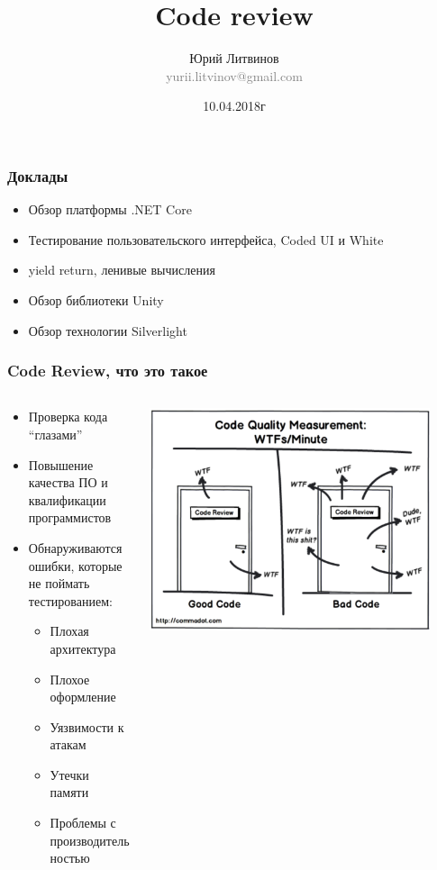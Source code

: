 \documentclass[xetex,mathserif,serif]{beamer}
\title{Code review}
\author[Юрий Литвинов]{Юрий Литвинов\\\small{\textcolor{gray}{yurii.litvinov@gmail.com}}}
\date{10.04.2018г}
\begin{document}
	\frame{\titlepage}

	\begin{frame}
		\frametitle{Доклады}
		\begin{itemize}
			\item Обзор платформы .NET Core
			\item Тестирование пользовательского интерфейса, Coded UI и White
			\item yield return, ленивые вычисления
			\item Обзор библиотеки Unity
			\item Обзор технологии Silverlight
		\end{itemize}
	\end{frame}

	\begin{frame}
		\frametitle{Code Review, что это такое}
		\begin{columns}
			\begin{column}{0.5\textwidth}
				\begin{itemize}
					\item Проверка кода ``глазами''
					\item Повышение качества ПО и квалификации программистов
					\item Обнаруживаются ошибки, которые не поймать тестированием:
					\begin{itemize}
						\item Плохая архитектура
						\item Плохое оформление
						\item Уязвимости к атакам
						\item Утечки памяти
						\item Проблемы с производительностью
					\end{itemize}
				\end{itemize}
			\end{column}
			\begin{column}{0.5\textwidth}
				\includegraphics[width=0.9\textwidth]{wtfs.png}
			\end{column}
		\end{columns}
	\end{frame}
\end{document}
